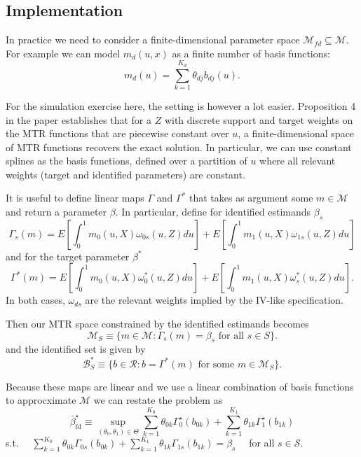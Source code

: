 \documentclass{article}
\begin{document}
\subsection{Implementation}
In practice we need to consider a finite-dimensional parameter space $\mathcal{M}_{fd}\subseteq \mathcal{M}$.
For example we can model $m_d(u,x)$ as a finite number of basis functions:
\begin{equation*}
    m_d(u) = \sum_{k=1}^{K_d}\theta_{dj}b_{dj}(u).
\end{equation*}

For the simulation exercise here, the setting is however a lot easier. Proposition 4 in the paper establishes that for a $Z$ with discrete support and target weights on the MTR functions that are piecewise constant over $u$, a finite-dimensional space of MTR functions recovers the exact solution.
In particular, we can use constant splines as the basis functions, defined over a partition of $u$ where all relevant weights (target and identified parameters) are constant.

It is useful to define linear maps $\Gamma$ and $\Gamma^*$ that takes as argument some $m\in\mathcal{M}$ and return a parameter $\beta$.
In particular, define for identified estimands $\beta_s$
\begin{equation}
    \Gamma_s(m) = E\left[\int_0^1 m_0(u,X)\omega_{0s}(u,Z)du\right]
    + E\left[\int_0^1 m_1(u,X)\omega_{1s}(u,Z)du\right]
\end{equation}
and for the target parameter $\beta^*$
\begin{equation}
    \Gamma^*(m) = E\left[\int_0^1 m_0(u,X)\omega^*_{0}(u,Z)du\right]
    + E\left[\int_0^1 m_1(u,X)\omega^*_{s}(u,Z)du\right].
\end{equation}
In both cases, $\omega_{ds}$ are the relevant weights implied by the IV-like specification.

Then our MTR space constrained by the identified estimands becomes  
\begin{equation}
    \mathcal{M}_S \equiv \{m\in \mathcal{M}: \Gamma_s(m) = \beta_s \text{ for all } s\in S\}.
\end{equation}   
and the identified set is given by
\begin{equation}
    \mathcal{B}^*_S \equiv \{b \in \mathcal{R}: b = \Gamma^*(m) \text{ for some } m \in \mathcal{M}_S\}.
\end{equation}

Because these maps are linear and we use a linear combination of basis functions to approcximate $\mathcal{M}$ we can restate the problem as
$$
\bar{\beta}_{\mathrm{fd}}^{\star} \equiv \sup _{\left(\theta_0, \theta_1\right) \in \Theta} \sum_{k=1}^{K_0} \theta_{0 k} \Gamma_0^{\star}\left(b_{0 k}\right)+\sum_{k=1}^{K_1} \theta_{1 k} \Gamma_1^{\star}\left(b_{1 k}\right)
$$
s.t. $\quad \sum_{k=1}^{K_0} \theta_{0 k} \Gamma_{0 s}\left(b_{0 k}\right)+\sum_{k=1}^{K_1} \theta_{1 k} \Gamma_{1 s}\left(b_{1 k}\right)=\beta_s \quad$ for all $s \in \mathcal{S}$.
\end{document}
